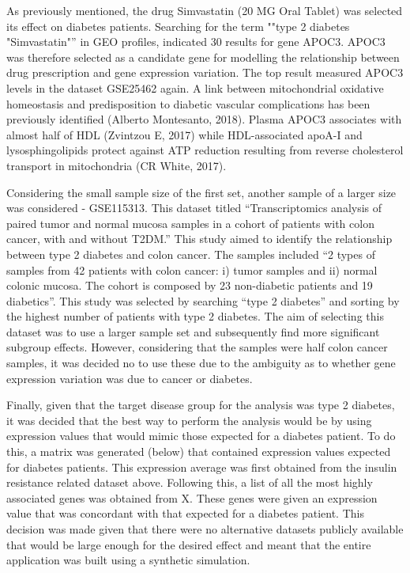 \documentclass{bioinfo}
\begin{document}
\begin{methods}
As previously mentioned, the drug Simvastatin (20 MG Oral Tablet) was selected its effect on diabetes patients. Searching for the term ""type 2 diabetes "Simvastatin"'' in GEO profiles, indicated 30 results for gene APOC3. APOC3 was therefore selected as a candidate gene for modelling the relationship between drug prescription and gene expression variation. The top result measured APOC3 levels in the dataset GSE25462 again. A link between mitochondrial oxidative homeostasis and predisposition to diabetic vascular complications has been previously identified (Alberto Montesanto, 2018). Plasma APOC3 associates with almost half of HDL (Zvintzou E, 2017) while HDL-associated apoA-I and lysosphingolipids protect against ATP reduction resulting from reverse cholesterol transport in mitochondria (CR White, 2017). 

Considering the small sample size of the first set, another sample of a larger size was considered - GSE115313. This dataset titled “Transcriptomics analysis of paired tumor and normal mucosa samples in a cohort of patients with colon cancer, with and without T2DM.” This study aimed to identify the relationship between type 2 diabetes and colon cancer. The samples included ``2 types of samples from 42 patients with colon cancer: i) tumor samples and ii) normal colonic mucosa. The cohort is composed by 23 non-diabetic patients and 19 diabetics''. This study was selected by searching “type 2 diabetes” and sorting by the highest number of patients with type 2 diabetes. The aim of selecting this dataset was to use a larger sample set and subsequently find more significant subgroup effects. However, considering that the samples were half colon cancer samples, it was decided no to use these due to the ambiguity as to whether gene expression variation was due to cancer or diabetes.

Finally, given that the target disease group for the analysis was type 2 diabetes, it was decided that the best way to perform the analysis would be by using expression values that would mimic those expected for a diabetes patient. To do this, a matrix was generated (below) that contained expression values expected for diabetes patients. This expression average was first obtained from the insulin resistance related dataset above. Following this, a list of all the most highly associated genes was obtained from X. These genes were given an expression value that was concordant with that expected for a diabetes patient. This decision was made given that there were no alternative datasets publicly available that would be large enough for the desired effect and meant that the entire application was built using a synthetic simulation.

\end{methods}
\end{document}
